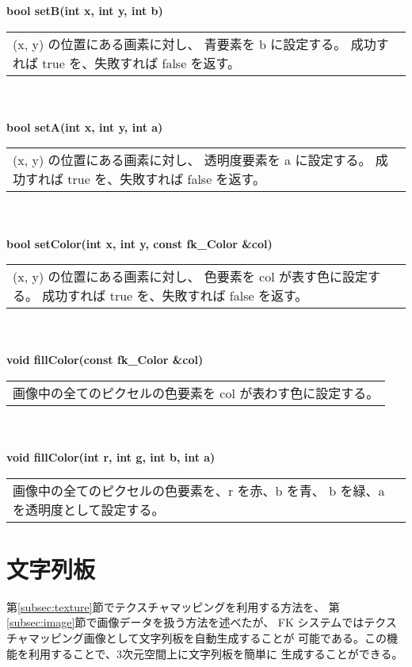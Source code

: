 \begin{tabbing}
\> \textbf{bool setB(int x, int y, int b)} \\
	\> \> \begin{tabular}{p{15cm}}
		(x, y) の位置にある画素に対し、
		青要素を b に設定する。
		成功すれば true を、失敗すれば false を返す。
	\end{tabular} \\ \\

\> \textbf{bool setA(int x, int y, int a)} \\
	\> \> \begin{tabular}{p{15cm}}
		(x, y) の位置にある画素に対し、
		透明度要素を a に設定する。
		成功すれば true を、失敗すれば false を返す。
	\end{tabular} \\ \\

\> \textbf{bool setColor(int x, int y, const fk\_Color \&col)} \\
	\> \> \begin{tabular}{p{15cm}}
		(x, y) の位置にある画素に対し、
		色要素を col が表す色に設定する。
		成功すれば true を、失敗すれば false を返す。
	\end{tabular} \\ \\

\> \textbf{void fillColor(const fk\_Color \&col)} \\
	\> \> \begin{tabular}{p{15cm}}
		画像中の全てのピクセルの色要素を col が表わす色に設定する。
	\end{tabular} \\ \\

\> \textbf{void fillColor(int r, int g, int b, int a)} \\
	\> \> \begin{tabular}{p{15cm}}
		画像中の全てのピクセルの色要素を、r を赤、b を青、
		b を緑、a を透明度として設定する。
	\end{tabular}
\end{tabbing}

\section{文字列板}
第\ref{subsec:texture}節でテクスチャマッピングを利用する方法を、
第\ref{subsec:image}節で画像データを扱う方法を述べたが、
FK システムではテクスチャマッピング画像として文字列板を自動生成することが
可能である。この機能を利用することで、3次元空間上に文字列板を簡単に
生成することができる。

